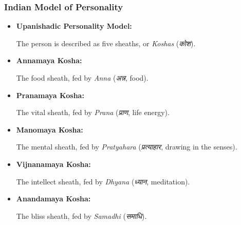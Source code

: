 \begin{frame}[fragile]\frametitle{Indian Model of Personality}

      \begin{itemize}
        \item \textbf{Upanishadic Personality Model:}
        
        The person is described as five sheaths, or \textit{Koshas} (\textit{कोश}).

        \item \textbf{Annamaya Kosha:}

        The food sheath, fed by \textit{Anna} (\textit{अन्न}, food).

        \item \textbf{Pranamaya Kosha:}

        The vital sheath, fed by \textit{Prana} (\textit{प्राण}, life energy).

        \item \textbf{Manomaya Kosha:}

        The mental sheath, fed by \textit{Pratyahara} (\textit{प्रत्याहार}, drawing in the senses).

        \item \textbf{Vijnanamaya Kosha:}

        The intellect sheath, fed by \textit{Dhyana} (\textit{ध्यान}, meditation).

        \item \textbf{Anandamaya Kosha:}

        The bliss sheath, fed by \textit{Samadhi} (\textit{समाधि}).
        
      \end{itemize}

\end{frame}


